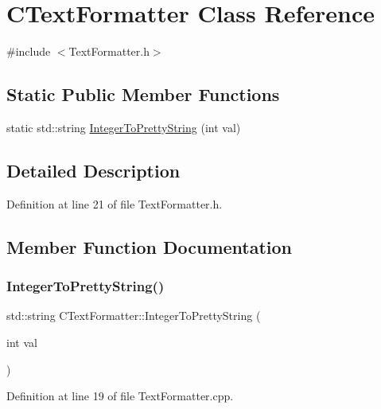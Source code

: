 \hypertarget{classCTextFormatter}{}\section{C\+Text\+Formatter Class Reference}
\label{classCTextFormatter}


{\ttfamily \#include $<$Text\+Formatter.\+h$>$}

\subsection*{Static Public Member Functions}
\begin{DoxyCompactItemize}
\item 
static std\+::string \hyperlink{classCTextFormatter_a99cc7219fb635bff88c31f0b906f5db0}{Integer\+To\+Pretty\+String} (int val)
\end{DoxyCompactItemize}


\subsection{Detailed Description}


Definition at line 21 of file Text\+Formatter.\+h.



\subsection{Member Function Documentation}
\hypertarget{classCTextFormatter_a99cc7219fb635bff88c31f0b906f5db0}{}\label{classCTextFormatter_a99cc7219fb635bff88c31f0b906f5db0} 
\subsubsection{\texorpdfstring{Integer\+To\+Pretty\+String()}{IntegerToPrettyString()}}
{\footnotesize\ttfamily std\+::string C\+Text\+Formatter\+::\+Integer\+To\+Pretty\+String (\begin{DoxyParamCaption}\item[{int}]{val }\end{DoxyParamCaption})\hspace{0.3cm}{\ttfamily [static]}}



Definition at line 19 of file Text\+Formatter.\+cpp.



